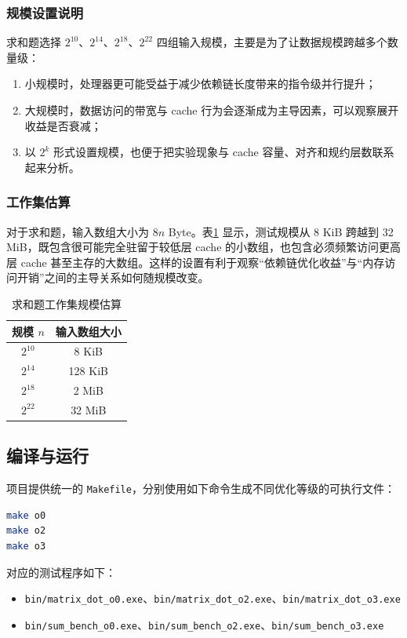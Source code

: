 \documentclass[a4paper]{article}
\begin{document}
\subsubsection{规模设置说明}
求和题选择 $2^{10}$、$2^{14}$、$2^{18}$、$2^{22}$ 四组输入规模，主要是为了让数据规模跨越多个数量级：
\begin{enumerate}
  \item 小规模时，处理器更可能受益于减少依赖链长度带来的指令级并行提升；
  \item 大规模时，数据访问的带宽与 cache 行为会逐渐成为主导因素，可以观察展开收益是否衰减；
  \item 以 $2^k$ 形式设置规模，也便于把实验现象与 cache 容量、对齐和规约层数联系起来分析。
\end{enumerate}

\subsubsection{工作集估算}
对于求和题，输入数组大小为 $8n$ Byte。表\ref{tab:sum-footprint} 显示，测试规模从 8 KiB 跨越到 32 MiB，既包含很可能完全驻留于较低层 cache 的小数组，也包含必须频繁访问更高层 cache 甚至主存的大数组。这样的设置有利于观察“依赖链优化收益”与“内存访问开销”之间的主导关系如何随规模改变。

\begin{table}[H]
  \centering
  \begin{tabular}{cc}
  \toprule
  规模 $n$ & 输入数组大小 \\
  \midrule
  $2^{10}$ & 8 KiB \\
  $2^{14}$ & 128 KiB \\
  $2^{18}$ & 2 MiB \\
  $2^{22}$ & 32 MiB \\
  \bottomrule
  \end{tabular}
  \caption{求和题工作集规模估算}
  \label{tab:sum-footprint}
\end{table}

\subsection{编译与运行}
项目提供统一的 \texttt{Makefile}，分别使用如下命令生成不同优化等级的可执行文件：
\begin{lstlisting}[title=构建命令,frame=trbl,language={bash}]
make o0
make o2
make o3
\end{lstlisting}

对应的测试程序如下：
\begin{itemize}
  \item \texttt{bin/matrix\_dot\_o0.exe}、\texttt{bin/matrix\_dot\_o2.exe}、\texttt{bin/matrix\_dot\_o3.exe}
  \item \texttt{bin/sum\_bench\_o0.exe}、\texttt{bin/sum\_bench\_o2.exe}、\texttt{bin/sum\_bench\_o3.exe}
\end{itemize}
\end{document}
